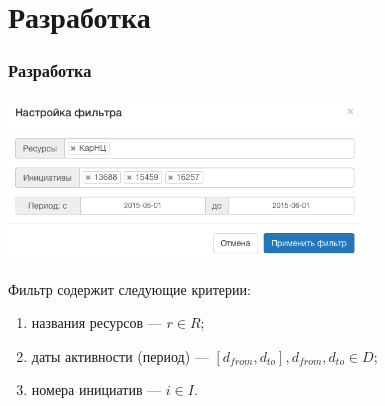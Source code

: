 \section{Разработка}
\begin{frame}
\frametitle{Разработка}

\vspace{0.5cm}
\includegraphics[width=0.7\textwidth]{images/filter}

Фильтр содержит следующие критерии:
\begin{enumerate}
  \item названия ресурсов --- $r \in R$;
  \item даты активности (период) --- $[d_{from}, d_{to}], d_{from}, d_{to} \in D$;
  \item номера инициатив --- $i \in I$.
\end{enumerate}
\end{frame}
